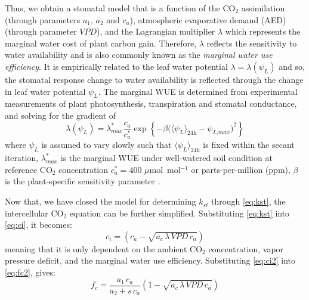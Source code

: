 Thus, we obtain a stomatal model that is a function of the CO$_2$ assimilation (through parameters $a_1$, $a_2$ and $c_a$), atmospheric evaporative demand (AED) (through parameter $\textit{VPD}$), and the Lagrangian multiplier $\lambda$ which represents the marginal water cost of plant carbon gain. Therefore, $\lambda$ reflects the sensitivity to water availability and is also commonly known as the \textit{marginal water use efficiency}. It is empirically related to the leaf water potential $\lambda = \lambda(\psi_L)$ \citep{Manoli2014,Katul2010} and so, the stomatal response change to water availability is reflected through the change in leaf water potential $\psi_L$. The marginal WUE is determined from experimental measurements of plant photosynthesis, transpiration and stomatal conductance, and solving for the gradient of 
\begin{equation}
\lambda \left(\psi_L\right) = \lambda_{\textit{max}}^* \frac{c_a}{c_a^*}\exp \left\{-\beta \Big( \langle \psi_L \rangle_{\textit{24h}} - \psi_{\textit{L,max}}\Big)^2\right\}
\label{eq:mwue}
\end{equation}
where $\psi_L$ is assumed to vary slowly such that $\langle \psi_L \rangle_{\textit{24h}}$ is fixed within the secant iteration, $\lambda_{max}^*$ is the marginal WUE under well-watered soil condition at reference CO$_2$ concentration $c_a^*=400$ $\mu$mol~mol$^{-1}$ or parts-per-million (ppm), $\beta$ is the plant-specific sensitivity parameter \citep{Huang2017}.

Now that, we have closed the model for determining $k_{\textit{st}}$ through \cref{eq:kst}, the intercellular CO$_2$ equation can be further simplified. Substituting \cref{eq:kst} into \cref{eq:ci}, it becomes:
\begin{equation}
c_i = \left(c_a - \sqrt{a_c\,\lambda\, \textit{VPD}\, c_a} \right)
\label{eq:ci2}
\end{equation}
meaning that it is only dependent on the ambient CO$_2$ concentration, vapor pressure deficit, and the marginal water use efficiency. Substituting \cref{eq:ci2} into \cref{eq:fc2}, gives:
\begin{equation}
f_c = \frac{a_1\,c_a}{a_2 + s\,c_a}\left(1-\sqrt{a_c\, \lambda\, \textit{VPD}\, c_a}\right)
\end{equation} 


